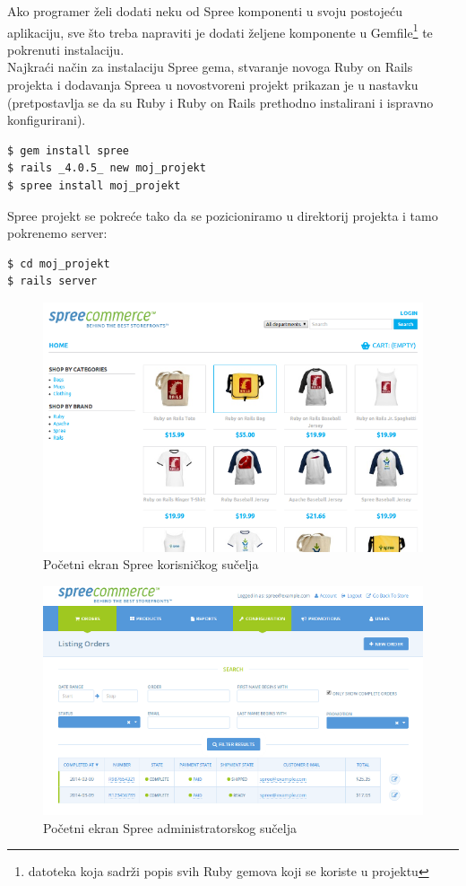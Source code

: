 Ako programer želi dodati neku od Spree komponenti u svoju postojeću aplikaciju, sve što treba napraviti je dodati željene komponente u Gemfile\footnote{datoteka koja sadrži popis svih Ruby gemova koji se koriste u projektu} te pokrenuti instalaciju.
\\
Najkraći način za instalaciju Spree gema, stvaranje novoga Ruby on Rails projekta i dodavanja Spreea u novostvoreni projekt prikazan je u nastavku (pretpostavlja se da su Ruby i Ruby on Rails prethodno instalirani i ispravno konfigurirani).

\begin{lstlisting}[language=bash]
$ gem install spree
$ rails _4.0.5_ new moj_projekt
$ spree install moj_projekt
\end{lstlisting}

Spree projekt se pokreće tako da se pozicioniramo u direktorij projekta i tamo pokrenemo server:
\begin{lstlisting}[language=bash]
$ cd moj_projekt
$ rails server
\end{lstlisting}

\begin{figure}[H]
    \centering
    \includegraphics[scale=0.65]{pictures/spree-small}
    \caption{Početni ekran Spree korisničkog sučelja}
    \label{pic:spree}
\end{figure}

\begin{figure}[H]
    \centering
    \includegraphics[scale=0.65]{pictures/spree-admin-small}
    \caption{Početni ekran Spree administratorskog sučelja}
    \label{pic:spreeAdmin}
\end{figure}

